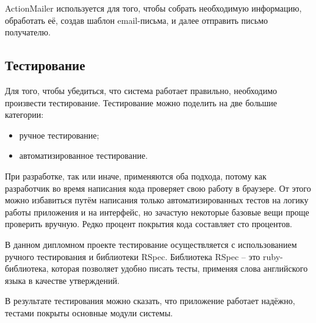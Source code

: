 ActionMailer используется для того, чтобы собрать необходимую информацию, обработать её, создав шаблон email-письма, и далее отправить письмо получателю.

\subsection{Тестирование}

Для того, чтобы убедиться, что система работает правильно, необходимо произвести тестирование. Тестирование можно поделить на две большие категории:

\begin{itemize}
  \item ручное тестирование;
  \item автоматизированное тестирование.
\end{itemize}

При разработке, так или иначе, применяются оба подхода, потому как разработчик во время написания кода проверяет свою работу в браузере. От этого можно избавиться путём написания только автоматизированных тестов на логику работы приложения и на интерфейс, но зачастую некоторые базовые вещи проще проверить вручную. Редко процент покрытия кода составляет сто процентов.

В данном дипломном проекте тестирование осуществляется с использованием ручного тестирования и библиотеки RSpec. Библиотека RSpec -- это ruby-библиотека, которая позволяет удобно писать тесты, применяя слова английского языка в качестве утверждений.

В результате тестирования можно сказать, что приложение работает надёжно, тестами покрыты основные модули системы.
